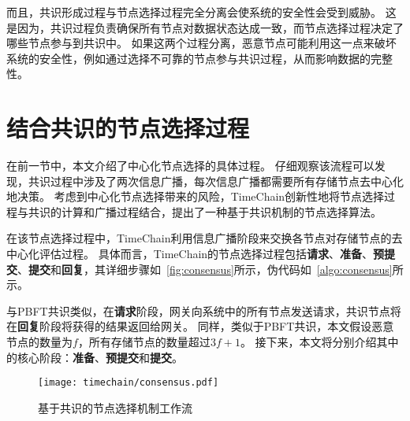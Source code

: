 而且，共识形成过程与节点选择过程完全分离会使系统的安全性会受到威胁。
这是因为，共识过程负责确保所有节点对数据状态达成一致，而节点选择过程决定了哪些节点参与到共识中。
如果这两个过程分离，恶意节点可能利用这一点来破坏系统的安全性，例如通过选择不可靠的节点参与共识过程，从而影响数据的完整性。

\section{结合共识的节点选择过程}

在前一节中，本文介绍了中心化节点选择的具体过程。
仔细观察该流程可以发现，共识过程中涉及了两次信息广播，每次信息广播都需要所有存储节点去中心化地决策。
考虑到中心化节点选择带来的风险，TimeChain创新性地将节点选择过程与共识的计算和广播过程结合，提出了一种基于共识机制的节点选择算法。

在该节点选择过程中，TimeChain利用信息广播阶段来交换各节点对存储节点的去中心化评估过程。
具体而言，TimeChain的节点选择过程包括\textbf{请求}、\textbf{准备}、\textbf{预提交}、\textbf{提交}和\textbf{回复}，其详细步骤如~\autoref{fig:consensus}所示，伪代码如~\autoref{algo:consensus}所示。

与PBFT共识类似，在\textbf{请求}阶段，网关向系统中的所有节点发送请求，共识节点将在\textbf{回复}阶段将获得的结果返回给网关。
同样，类似于PBFT共识，本文假设恶意节点的数量为$f$，所有存储节点的数量超过$3f+1$。
接下来，本文将分别介绍其中的核心阶段：\textbf{准备}、\textbf{预提交}和\textbf{提交}。

\begin{figure}[t]
    \centering
    \texttt{[image: timechain/consensus.pdf]}
    \caption{基于共识的节点选择机制工作流}
    \label{fig:consensus}
\end{figure}

